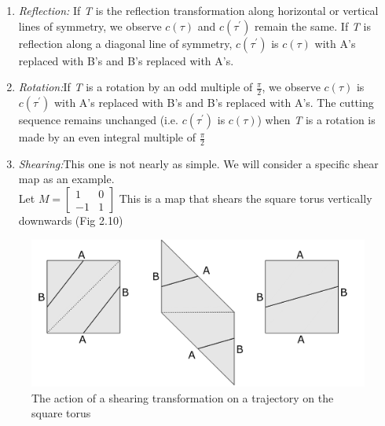 \documentclass{report}
\begin{document}
\begin{enumerate}
\item  {\emph{Reflection:} If \textit{T} is the reflection transformation along horizontal or vertical lines of symmetry, we observe $c(\tau)$ and $c(\tau^{'})$ remain the same. If \textit{T} is reflection along a diagonal line of symmetry, $c(\tau^{'})$ is $c(\tau)$ with A’s replaced with B’s and B’s replaced with A’s.}
\item  {\emph{Rotation:}If \textit{T} is a rotation by an odd multiple of $\frac{\pi}{2}$, we observe $c(\tau)$ is $c(\tau^{'})$ with A’s replaced with B’s and B’s replaced with A’s. The cutting sequence remains unchanged (i.e. $c(\tau^{'})$ is $c(\tau)$) when \textit{T} is a rotation is made by an even integral multiple of $\frac{\pi}{2}$}
\item  {\emph{Shearing:}This one is not nearly as simple. We will consider a specific shear map as an example. \\
Let $M = \begin{bmatrix} 1&0\\-1&1 \end{bmatrix}$ This is a map that shears the square torus vertically downwards (Fig 2.10) }
\end{enumerate}

\begin{figure} 
\begin{center}
\includegraphics[scale=0.3]{2.10}
\caption{The action of a shearing transformation on a trajectory on the square torus}
\end{center}
\end{figure}
\end{document}
